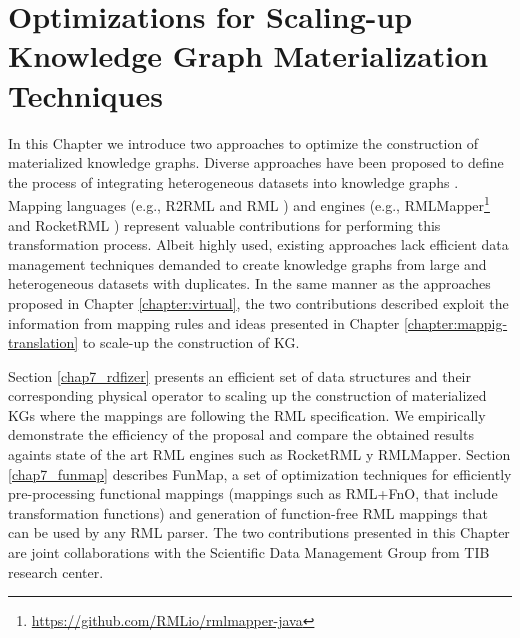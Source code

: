
\chapter{Optimizations for Scaling-up Knowledge Graph Materialization Techniques}
\label{chapter:construction}


In this Chapter we introduce two approaches to optimize the construction of materialized knowledge graphs. Diverse approaches have been proposed to define the process of integrating heterogeneous datasets into knowledge graphs \citep{chebotko2009semantics,calvanese2017ontop,chaves2019what,priyatna2014formalisation}. Mapping languages (e.g., R2RML \citep{R2RML} and RML \citep{dimou2014rml}) and engines (e.g., RMLMapper\footnote{\url{https://github.com/RMLio/rmlmapper-java}} and RocketRML \citep{csimcsek2019rocketrml}) represent valuable contributions for performing this transformation process. Albeit highly used, existing approaches lack efficient data management techniques demanded to create knowledge graphs from large and heterogeneous datasets with duplicates. In the same manner as the approaches proposed in Chapter \ref{chapter:virtual}, the two contributions described exploit the information from mapping rules and ideas presented in Chapter \ref{chapter:mappig-translation} to scale-up the construction of KG.

Section \ref{chap7_rdfizer} presents an efficient set of data structures and their corresponding physical operator to scaling up the construction of materialized KGs where the mappings are following the RML specification. We empirically demonstrate the efficiency of the proposal and compare the obtained results againts state of the art RML engines such as RocketRML y RMLMapper. Section \ref{chap7_funmap} describes FunMap, a set of optimization techniques for efficiently pre-processing functional mappings (mappings such as RML+FnO, that include transformation functions) and generation of function-free RML mappings that can be used by any RML parser. The two contributions presented in this Chapter are joint collaborations with the Scientific Data Management Group from TIB research center.






